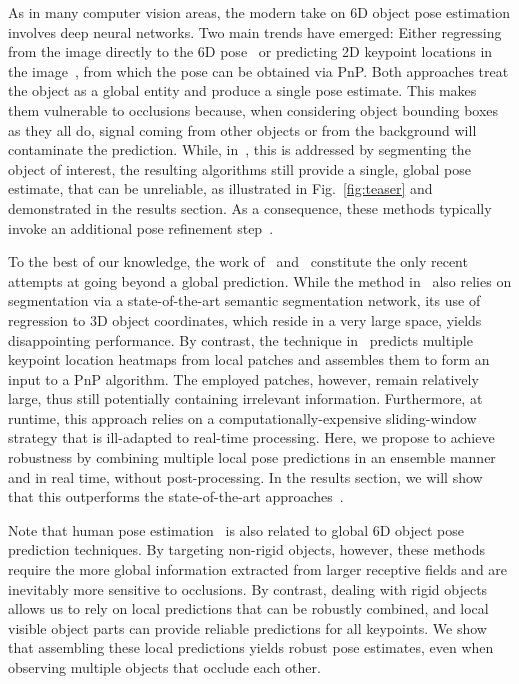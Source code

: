 \documentclass[10pt,twocolumn,letterpaper]{article}
\begin{document}
As in many computer vision areas, the modern take on 6D object pose estimation involves deep neural networks. Two main trends have emerged: Either regressing from the image directly to the 6D pose~\cite{Kehl17,Xiang18b} or predicting 2D keypoint locations in the image~\cite{Rad17,Tekin18a}, from which the pose can be obtained via PnP. Both approaches treat the object as a global entity and produce a single pose estimate.
This makes them vulnerable to occlusions because, when considering object bounding boxes as they all do, signal coming from other objects or from the background will contaminate the prediction. While, in~\cite{Rad17,Xiang18b}, this is addressed by segmenting the object of interest, the resulting algorithms still provide a single, global pose estimate, that can be unreliable, as illustrated in Fig.~\ref{fig:teaser} and demonstrated in the results section.  As a consequence, these methods typically invoke an additional pose refinement step~\cite{Li18a}. 


To the best of our knowledge, the work of~\cite{Jafari18} and~\cite{Oberweger18} constitute the only recent attempts at going beyond a global prediction. While the method in~\cite{Jafari18} also relies on segmentation via a state-of-the-art semantic segmentation network, its use of regression to 3D object coordinates, which reside in a very large space, yields disappointing performance. 
By contrast, the technique in~\cite{Oberweger18} predicts multiple keypoint location heatmaps from local patches and assembles them to form an input to a PnP algorithm. The employed patches, however, remain relatively large, thus still potentially containing irrelevant information. Furthermore, at runtime, this approach relies on a computationally-expensive sliding-window strategy that is ill-adapted to real-time processing.
Here, we propose to achieve robustness by combining multiple local pose predictions in an ensemble manner and in real time, without post-processing. In the results section, we will show that this outperforms the state-of-the-art approaches~\cite{Kehl17,Xiang18b,Rad17,Tekin18a,Jafari18,Oberweger18}. 

Note that human pose estimation~\cite{He17,Wei16,Papandreou18} is also related to global 6D object pose prediction techniques.
By targeting non-rigid objects, however, these methods require the more global information extracted from larger receptive fields and are inevitably more sensitive to occlusions.
By contrast, dealing with rigid objects allows us to rely on local predictions that can be robustly combined, and local visible object parts can provide reliable predictions for all keypoints. We show that assembling these local predictions yields robust pose estimates, even when observing multiple objects that occlude each other.
\end{document}
